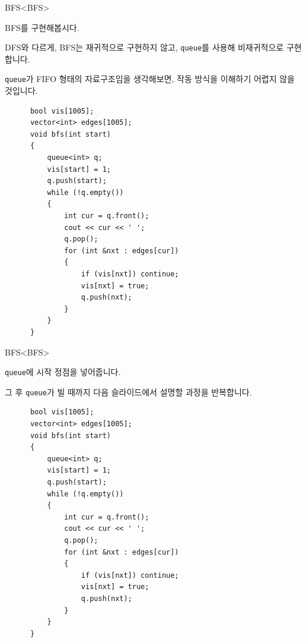 \begin{frame}[fragile]{BFS}{<BFS>}
  \begin{twocol}
    \vspace{4mm}
    BFS를 구현해봅시다.\par\vspace{2mm}
    DFS와 다르게, BFS는 재귀적으로 구현하지 않고, \texttt{queue}를 사용해 비재귀적으로
    구현합니다.\par\vspace{2mm}
    \texttt{queue}가 FIFO 형태의 자료구조임을 생각해보면, 작동 방식을 이해하기 어렵지
    않을 것입니다.
  \colsplit
    \begin{verbatim}
      bool vis[1005];
      vector<int> edges[1005];
      void bfs(int start)
      {
          queue<int> q;
          vis[start] = 1;
          q.push(start);
          while (!q.empty())
          {
              int cur = q.front();
              cout << cur << ' ';
              q.pop();
              for (int &nxt : edges[cur])
              {
                  if (vis[nxt]) continue;
                  vis[nxt] = true;
                  q.push(nxt);
              }
          }
      }
    \end{verbatim}
  \end{twocol}
\end{frame}

\begin{frame}[fragile]{BFS}{<BFS>}
  \begin{twocol}
    \vspace{20mm}
    \texttt{queue}에 시작 정점을 넣어줍니다.\par\vspace{2mm}
    그 후 \texttt{queue}가 빌 때까지 다음 슬라이드에서 설명할 과정을 반복합니다.
  \colsplit
    \begin{verbatim}
      bool vis[1005];
      vector<int> edges[1005];
      void bfs(int start)
      {
          queue<int> q;
          vis[start] = 1;
          q.push(start);
          while (!q.empty())
          {
              int cur = q.front();
              cout << cur << ' ';
              q.pop();
              for (int &nxt : edges[cur])
              {
                  if (vis[nxt]) continue;
                  vis[nxt] = true;
                  q.push(nxt);
              }
          }
      }
    \end{verbatim}
  \end{twocol}
\end{frame}

